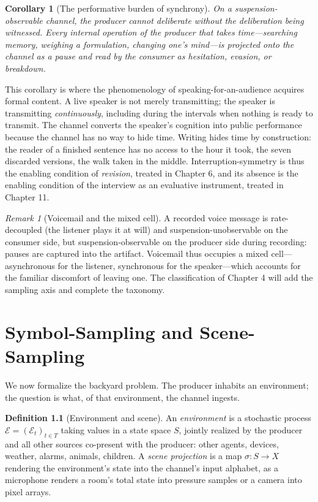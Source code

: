 \documentclass[11pt,oneside]{book}
\theoremstyle{plain}
\newtheorem{corollary}[theorem]{Corollary}
\theoremstyle{definition}
\newtheorem{definition}[theorem]{Definition}
\theoremstyle{remark}
\newtheorem{remark}[theorem]{Remark}
\newcommand{\Env}{\mathcal{E}}
\newcommand{\scene}{\sigma}
\begin{document}
\begin{corollary}[The performative burden of synchrony]
On a suspension-observable channel, the producer cannot deliberate without the deliberation being witnessed. Every internal operation of the producer that takes time---searching memory, weighing a formulation, changing one's mind---is projected onto the channel as a pause and read by the consumer as hesitation, evasion, or breakdown.
\end{corollary}

This corollary is where the phenomenology of speaking-for-an-audience acquires formal content. A live speaker is not merely transmitting; the speaker is transmitting \emph{continuously}, including during the intervals when nothing is ready to transmit. The channel converts the speaker's cognition into public performance because the channel has no way to hide time. Writing hides time by construction: the reader of a finished sentence has no access to the hour it took, the seven discarded versions, the walk taken in the middle. Interruption-symmetry is thus the enabling condition of \emph{revision}, treated in Chapter 6, and its absence is the enabling condition of the interview as an evaluative instrument, treated in Chapter 11.

\begin{remark}[Voicemail and the mixed cell]
A recorded voice message is rate-decoupled (the listener plays it at will) and suspension-unobservable on the consumer side, but suspension-observable on the producer side during recording: pauses are captured into the artifact. Voicemail thus occupies a mixed cell---asynchronous for the listener, synchronous for the speaker---which accounts for the familiar discomfort of leaving one. The classification of Chapter 4 will add the sampling axis and complete the taxonomy.
\end{remark}

\chapter{Symbol-Sampling and Scene-Sampling}

We now formalize the backyard problem. The producer inhabits an environment; the question is what, of that environment, the channel ingests.

\begin{definition}[Environment and scene]
An \emph{environment} is a stochastic process $\Env = (\Env_t)_{t \in T}$ taking values in a state space $S$, jointly realized by the producer and all other sources co-present with the producer: other agents, devices, weather, alarms, animals, children. A \emph{scene projection} is a map $\scene : S \to X$ rendering the environment's state into the channel's input alphabet, as a microphone renders a room's total state into pressure samples or a camera into pixel arrays.
\end{definition}
\end{document}
